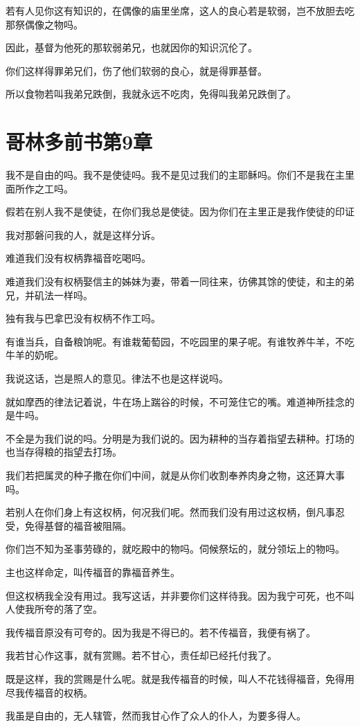\documentclass[12pt,oneside]{book}
\begin{document}
若有人见你这有知识的，在偶像的庙里坐席，这人的良心若是软弱，岂不放胆去吃那祭偶像之物吗。

因此，基督为他死的那软弱弟兄，也就因你的知识沉伦了。

你们这样得罪弟兄们，伤了他们软弱的良心，就是得罪基督。

所以食物若叫我弟兄跌倒，我就永远不吃肉，免得叫我弟兄跌倒了。

\chapter{哥林多前书第9章}
我不是自由的吗。我不是使徒吗。我不是见过我们的主耶稣吗。你们不是我在主里面所作之工吗。

假若在别人我不是使徒，在你们我总是使徒。因为你们在主里正是我作使徒的印证

我对那磐问我的人，就是这样分诉。

难道我们没有权柄靠福音吃喝吗。

难道我们没有权柄娶信主的姊妹为妻，带着一同往来，彷佛其馀的使徒，和主的弟兄，并矶法一样吗。

独有我与巴拿巴没有权柄不作工吗。

有谁当兵，自备粮饷呢。有谁栽葡萄园，不吃园里的果子呢。有谁牧养牛羊，不吃牛羊的奶呢。

我说这话，岂是照人的意见。律法不也是这样说吗。

就如摩西的律法记着说，牛在场上踹谷的时候，不可笼住它的嘴。难道神所挂念的是牛吗。

不全是为我们说的吗。分明是为我们说的。因为耕种的当存着指望去耕种。打场的也当存得粮的指望去打场。

我们若把属灵的种子撒在你们中间，就是从你们收割奉养肉身之物，这还算大事吗。

若别人在你们身上有这权柄，何况我们呢。然而我们没有用过这权柄，倒凡事忍受，免得基督的福音被阻隔。

你们岂不知为圣事劳碌的，就吃殿中的物吗。伺候祭坛的，就分领坛上的物吗。

主也这样命定，叫传福音的靠福音养生。

但这权柄我全没有用过。我写这话，并非要你们这样待我。因为我宁可死，也不叫人使我所夸的落了空。

我传福音原没有可夸的。因为我是不得已的。若不传福音，我便有祸了。

我若甘心作这事，就有赏赐。若不甘心，责任却已经托付我了。

既是这样，我的赏赐是什么呢。就是我传福音的时候，叫人不花钱得福音，免得用尽我传福音的权柄。

我虽是自由的，无人辖管，然而我甘心作了众人的仆人，为要多得人。
\end{document}
